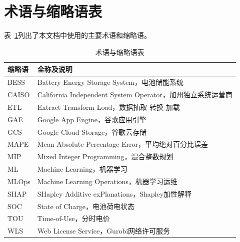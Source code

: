 \section{术语与缩略语表}

表~\ref{tab:glossary}列出了本文档中使用的主要术语和缩略语。

\begin{table}[htbp]
    \centering
    \caption{术语与缩略语表}
    \label{tab:glossary}
    \begin{tabular}{lp{10cm}}
        \toprule
        \textbf{缩略语} & \textbf{全称及说明}                                   \\
        \midrule
        BESS         & Battery Energy Storage System，电池储能系统             \\
        CAISO        & California Independent System Operator，加州独立系统运营商 \\
        ETL          & Extract-Transform-Load，数据抽取-转换-加载                \\
        GAE          & Google App Engine，谷歌应用引擎                         \\
        GCS          & Google Cloud Storage，谷歌云存储                       \\
        MAPE         & Mean Absolute Percentage Error，平均绝对百分比误差         \\
        MIP          & Mixed Integer Programming，混合整数规划                 \\
        ML           & Machine Learning，机器学习                            \\
        MLOps        & Machine Learning Operations，机器学习运维               \\
        SHAP         & SHapley Additive exPlanations，Shapley加性解释        \\
        SOC          & State of Charge，电池荷电状态                           \\
        TOU          & Time-of-Use，分时电价                                 \\
        WLS          & Web License Service，Gurobi网络许可服务                 \\
        \bottomrule
    \end{tabular}
\end{table}